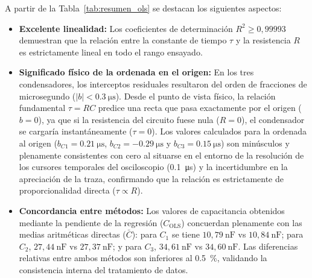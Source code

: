 \begin{table}[H]
    \centering
    \caption{Parámetros de la regresión lineal complementaria por MCO ($\tau$ vs $R$).}
    \label{tab:resumen_ols}
\end{table}

A partir de la Tabla~\ref{tab:resumen_ols} se destacan los siguientes aspectos:
\begin{itemize}
    \item \textbf{Excelente linealidad:} Los coeficientes de determinación $R^2 \ge 0{,}99993$ demuestran que la relación entre la constante de tiempo $\tau$ y la resistencia $R$ es estrictamente lineal en todo el rango ensayado.
    \item \textbf{Significado físico de la ordenada en el origen:} En los tres condensadores, los interceptos residuales resultaron del orden de fracciones de microsegundo ($|b| < \qty{0,3}{\micro\second}$). Desde el punto de vista físico, la relación fundamental $\tau = RC$ predice una recta que pasa exactamente por el origen ($b = 0$), ya que si la resistencia del circuito fuese nula ($R = 0$), el condensador se cargaría instantáneamente ($\tau = 0$). Los valores calculados para la ordenada al origen ($b_{C1} = \qty{0,21}{\micro\second}$, $b_{C2} = \qty{-0,29}{\micro\second}$ y $b_{C3} = \qty{0,15}{\micro\second}$) son minúsculos y plenamente consistentes con cero al situarse en el entorno de la resolución de los cursores temporales del osciloscopio (\qty{0,1}{\micro\second}) y la incertidumbre en la apreciación de la traza, confirmando que la relación es estrictamente de proporcionalidad directa ($\tau \propto R$).
    \item \textbf{Concordancia entre métodos:} Los valores de capacitancia obtenidos mediante la pendiente de la regresión ($C_{\text{OLS}}$) concuerdan plenamente con las medias aritméticas directas ($\bar{C}$): para $C_1$ se tiene $10{,}79\ \unit{\nano\farad}$ vs $10{,}84\ \unit{\nano\farad}$; para $C_2$, $27{,}44\ \unit{\nano\farad}$ vs $27{,}37\ \unit{\nano\farad}$; y para $C_3$, $34{,}61\ \unit{\nano\farad}$ vs $34{,}60\ \unit{\nano\farad}$. Las diferencias relativas entre ambos métodos son inferiores al \qty{0,5}{\percent}, validando la consistencia interna del tratamiento de datos.
\end{itemize}
